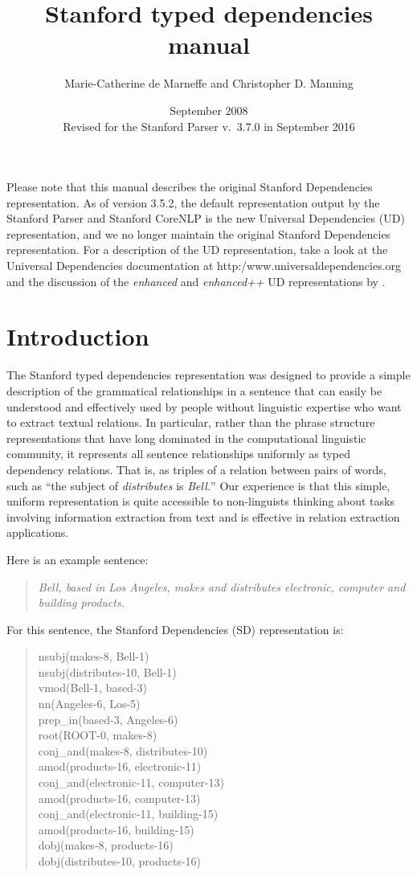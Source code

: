 \documentclass[11pt,letterpaper]{article}
\title{\textbf{Stanford typed dependencies manual}}
\author{Marie-Catherine de Marneffe and Christopher D. Manning}
\date{September 2008\\
Revised for the Stanford Parser v.\ 3.7.0 in September 2016
}
\begin{document}
\maketitle

\color{red}
Please note that this manual describes the original Stanford 
Dependencies representation. As of version 3.5.2, the default representation
output by the Stanford Parser and Stanford CoreNLP is the new Universal Dependencies (UD)
representation, and we no longer maintain the original Stanford Dependencies representation. For a description of the UD 
representation, take a look at the Universal Dependencies documentation at \textsf{http:/www.universaldependencies.org} and
the discussion of the \textit{enhanced} and \textit{enhanced++} UD representations by \citet{schuster2016enhanced}.
\color{black}
\section{Introduction}

The Stanford typed dependencies representation was designed to provide
a simple description of the grammatical relationships in a sentence
that can easily be understood and effectively used by people without
linguistic expertise who want to extract textual relations.  In
particular, rather than the phrase structure representations that have
long dominated in the computational linguistic community, it
represents all sentence relationships uniformly as typed dependency
relations. That is, as triples of a relation between pairs of words, such as ``the subject of
\emph{distributes} is \emph{Bell.}''  Our experience is that this simple,
uniform representation is quite accessible to non-linguists
thinking about tasks involving information extraction from text and is
effective in relation extraction applications.

Here is an example sentence:
\begin{quote}
\emph{Bell, based in Los Angeles, makes and distributes electronic, computer and building products.}
\end{quote}
For this sentence, the Stanford Dependencies (SD) representation is:
\begin{quote}
nsubj(makes-8, Bell-1) \\
nsubj(distributes-10, Bell-1) \\
vmod(Bell-1, based-3) \\
nn(Angeles-6, Los-5) \\
prep\_in(based-3, Angeles-6) \\
root(ROOT-0, makes-8)\\
conj\_and(makes-8, distributes-10) \\
amod(products-16, electronic-11) \\
conj\_and(electronic-11, computer-13) \\
amod(products-16, computer-13) \\
conj\_and(electronic-11, building-15) \\
amod(products-16, building-15) \\
dobj(makes-8, products-16) \\
dobj(distributes-10, products-16)
\end{quote}
\end{document}
